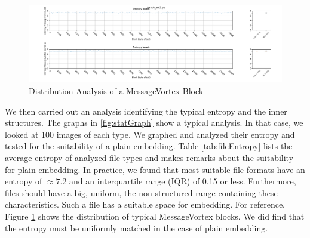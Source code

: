 \begin{figure}[ht]
	\includegraphics[width=\textwidth]{inc/statanalysis_mv}
	\caption{Distribution Analysis of a MessageVortex Block}
	\label{fig:statMvGraph}
\end{figure}

We then carried out an analysis identifying the typical entropy and the inner structures. The graphs in \ref{fig:statGraph} show a typical analysis. In that case, we looked at 100 images of each type. We graphed and analyzed their entropy and tested for the suitability of a plain embedding. Table \ref{tab:fileEntropy} lists the average entropy of analyzed file types and makes remarks about the suitability for plain embedding. In practice, we found that most suitable file formats have an entropy of $\approx 7.2$ and an interquartile range (IQR) of 0.15 or less. Furthermore, files should have a big, uniform, the non-structured range containing these characteristics. Such a file has a suitable space for embedding. For reference, Figure \ref{fig:statMvGraph} shows the distribution of typical MessageVortex blocks. We did find that the entropy must be uniformly matched in the case of plain embedding.

